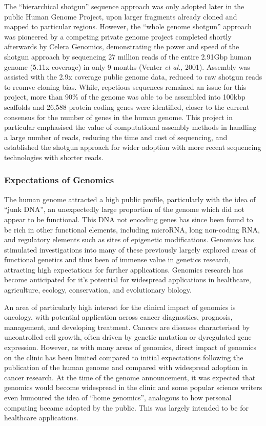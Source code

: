 The ``hierarchical shotgun'' sequence approach was only adopted later in the public Human Genome Project, upon larger fragments already cloned and mapped to particular regions. However, the ``whole genome shotgun'' approach was pioneered by a competing private genome project completed shortly afterwards by Celera Genomics, demonstrating the power and speed of the shotgun approach by sequencing 27 million reads of the entire 2.91Gbp human genome (5.11x coverage) in only 9-months (Venter \textit{et al.}, 2001). Assembly was assisted with the 2.9x coverage public genome data, reduced to raw shotgun reads to reomve cloning bias. While, repetious sequences remained an issue for this project, more than 90\% of the genome was able to be assembled into 100kbp scaffolds and 26,588 protein coding genes were identified, closer to the current consensus for the number of genes in the human genome. This project in particular emphasised the value of computational assembly methods in handling a large number of reads, reducing the time and cost of sequencing, and established the shotgun approach for wider adoption with more recent sequencing technologies with shorter reads.

\subsubsection{Expectations of Genomics}
The human genome attracted a high public profile, particularly with the idea of ``junk DNA'', an unexpectedly large proportion of the genome  which did not appear to be functional. This DNA not encoding genes has since been found to be rich in other functional elements, including microRNA, long non-coding RNA, and regulatory elements such as sites of epigenetic modifications. Genomics has stimulated investigations into many of these previously largely explored areas of functional genetics and thus been of immense value in genetics research, attracting high expectations for further applications. Genomics research has become anticipated for it's potential for widespread applications in healthcare, agriculture, ecology, conservation, and evolutionary biology.

An area of particularly high interest for the clinical impact of genomics is oncology, with potential application across cancer diagnostics, prognosis, management, and developing treatment. Cancers are diseases characterised by uncontrolled cell growth, often driven by genetic mutation or dyregulated gene expression. However, as with many areas of genomics, direct impact of genomics on the clinic has been limited compared to initial expectations following the publication of the human genome and compared with widespread adoption in cancer research. At the time of the genome announcement, it was expected that genomics would become widespread in the clinic and some popular science writers even humoured the idea of ``home genomics'', analogous to how personal computing became adopted by the public. This was largely intended to be for healthcare applications.


